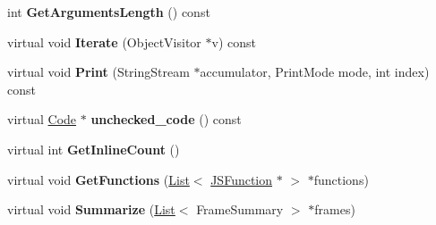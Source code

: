 \begin{DoxyCompactItemize}
\item 
\hypertarget{classv8_1_1internal_1_1_java_script_frame_a3fe52b1b92c6de465a80f20da27f173d}{}int {\bfseries Get\+Arguments\+Length} () const \label{classv8_1_1internal_1_1_java_script_frame_a3fe52b1b92c6de465a80f20da27f173d}

\item 
\hypertarget{classv8_1_1internal_1_1_java_script_frame_a4134a30bf43647258c8746b7a81c78c5}{}virtual void {\bfseries Iterate} (Object\+Visitor $\ast$v) const \label{classv8_1_1internal_1_1_java_script_frame_a4134a30bf43647258c8746b7a81c78c5}

\item 
\hypertarget{classv8_1_1internal_1_1_java_script_frame_ae765f27431702c1a010f770df3bf0f21}{}virtual void {\bfseries Print} (String\+Stream $\ast$accumulator, Print\+Mode mode, int index) const \label{classv8_1_1internal_1_1_java_script_frame_ae765f27431702c1a010f770df3bf0f21}

\item 
\hypertarget{classv8_1_1internal_1_1_java_script_frame_ae361d86510de429bec1dca7123ff8ae8}{}virtual \hyperlink{classv8_1_1internal_1_1_code}{Code} $\ast$ {\bfseries unchecked\+\_\+code} () const \label{classv8_1_1internal_1_1_java_script_frame_ae361d86510de429bec1dca7123ff8ae8}

\item 
\hypertarget{classv8_1_1internal_1_1_java_script_frame_a0b4eb9c514988a8993a97760aefb6005}{}virtual int {\bfseries Get\+Inline\+Count} ()\label{classv8_1_1internal_1_1_java_script_frame_a0b4eb9c514988a8993a97760aefb6005}

\item 
\hypertarget{classv8_1_1internal_1_1_java_script_frame_a58a1e47542e85f3124a32abf7795987a}{}virtual void {\bfseries Get\+Functions} (\hyperlink{classv8_1_1internal_1_1_list}{List}$<$ \hyperlink{classv8_1_1internal_1_1_j_s_function}{J\+S\+Function} $\ast$ $>$ $\ast$functions)\label{classv8_1_1internal_1_1_java_script_frame_a58a1e47542e85f3124a32abf7795987a}

\item 
\hypertarget{classv8_1_1internal_1_1_java_script_frame_a743a6dba2ed64959c63c8e891a977b29}{}virtual void {\bfseries Summarize} (\hyperlink{classv8_1_1internal_1_1_list}{List}$<$ Frame\+Summary $>$ $\ast$frames)\label{classv8_1_1internal_1_1_java_script_frame_a743a6dba2ed64959c63c8e891a977b29}

\end{DoxyCompactItemize}

